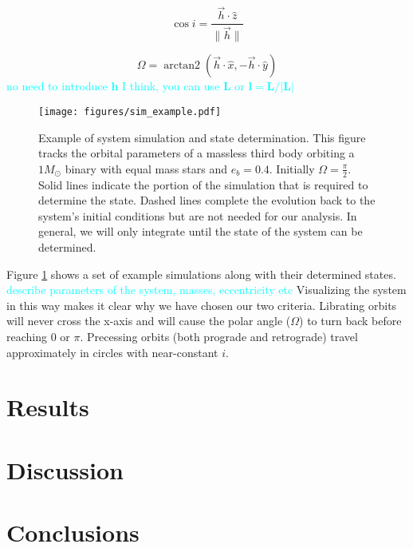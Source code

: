 \documentclass[twocolumn]{aastex631}
\newcommand{\RGM}[1]{\textcolor{cyan}{#1}}
\DeclareMathOperator{\arctantwo}{arctan2}
\begin{document}
\begin{equation}
    \cos{i} = \frac{\vec{h} \cdot \hat{z}}{\|\vec{h}\|}
    \label{eq:inclination}
\end{equation}

\begin{equation}
    \Omega = \arctantwo (\vec{h} \cdot \hat{x}, -\vec{h} \cdot \hat{y})
    \label{eq:omega}
\end{equation}
\RGM{no need to introduce $\bm{h}$ I think, you can  use $\bm{L}$ or $\bm{l}=\bm{L}/|\bm{L}|$}


\begin{figure}
    \begin{centering}
        \texttt{[image: figures/sim\_example.pdf]}
        \caption{Example of system simulation and state determination. This figure tracks the orbital parameters
        of a massless third body orbiting a $1 M_\odot$ binary with equal mass stars and $e_b = 0.4$.
        Initially $\Omega = \frac{\pi}{2}$.
        Solid lines indicate
        the portion of the simulation that is required to determine the state. Dashed lines complete the evolution back to the system's
        initial conditions but are not needed for our analysis. In general, we will only integrate until the state of the system can be
        determined.}
        \label{fig:sim_example}
    \end{centering}
\end{figure}

Figure \ref{fig:sim_example} shows a set of example simulations along with their determined states. \RGM{describe parameters of the system, masses, eccentricity etc} Visualizing the 
system in this way makes it clear why we have chosen our two criteria. Librating orbits will never cross the x-axis
and will cause the polar angle ($\Omega$) to turn back before reaching $0$ or $\pi$. Precessing orbits (both prograde and retrograde)
travel approximately in circles with near-constant $i$.

\section{Results}
\label{sec:results}

\section{Discussion}
\label{sec:discussion}

\section{Conclusions}
\label{sec:conclusions}
\end{document}
